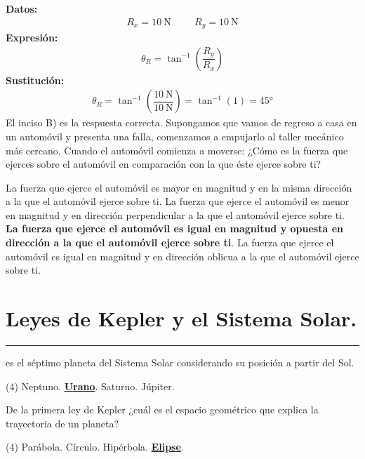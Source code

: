 \documentclass[12pt, letter]{exam}
\begin{document}
\begin{questions}
    \textbf{Datos:}
    \begin{align*}
    R_{x} = \SI{10}{\newton} \hspace{1cm} R_{y} = \SI{10}{\newton}
    \end{align*}
    \textbf{Expresión:}
    \begin{align*}
    \theta_{R} = \tan^{-1} \left( \dfrac{R_{y}}{R_{x}} \right)
    \end{align*}
    \textbf{Sustitución:}
    \begin{align*}
        \theta_{R} = \tan^{-1} \left( \dfrac{\SI{10}{\newton}}{\SI{10}{\newton}} \right) = \tan^{-1} (1) = \ang{45}
    \end{align*}
    El inciso B) es la respuesta correcta.
    \question Supongamos que vamos de regreso a casa en un automóvil y presenta una falla, comenzamos a empujarlo al taller mecánico más cercano. Cuando el automóvil comienza a moverse: ¿Cómo es la fuerza que ejerces sobre el automóvil en comparación con la que éste ejerce sobre ti? 
    \begin{tasks}
        \task La fuerza que ejerce el automóvil es mayor en magnitud y en la misma dirección a la que el automóvil ejerce sobre ti.
        \task La fuerza que ejerce el automóvil es menor en magnitud y en dirección perpendicular a la que el automóvil ejerce sobre ti.
        \task \textbf{La fuerza que ejerce el automóvil es igual en magnitud y opuesta en dirección a la que el automóvil ejerce sobre ti}.
        \task La fuerza que ejerce el automóvil es igual en magnitud y en dirección oblicua a la que el automóvil ejerce sobre ti.
    \end{tasks}

    \section{Leyes de Kepler y el Sistema Solar.}
    
    \question \rule{2cm}{0.1mm} es el séptimo planeta del Sistema Solar considerando su posición a partir del Sol.
    \begin{tasks}(4)
        \task Neptuno.
        \task \underline{\textbf{Urano}}.
        \task Saturno.
        \task Júpiter.
    \end{tasks}
    \question De la primera ley de Kepler ¿cuál es el espacio geométrico que explica la trayectoria de un planeta?
    \begin{tasks}(4)
        \task Parábola.
        \task Círculo.
        \task Hipérbola.
        \task \underline{\textbf{Elipse}}.
    \end{tasks}
    
\end{questions}
\end{document}
